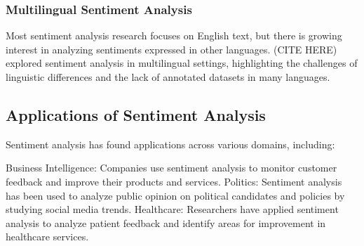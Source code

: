 \subsubsection{Multilingual Sentiment Analysis}

Most sentiment analysis research focuses on English text, but there is growing interest in analyzing sentiments expressed in other languages. (CITE HERE) explored sentiment analysis in multilingual settings, highlighting the challenges of linguistic differences and the lack of annotated datasets in many languages.

\subsection{Applications of Sentiment Analysis}

Sentiment analysis has found applications across various domains, including:

Business Intelligence: Companies use sentiment analysis to monitor customer feedback and improve their products and services.
Politics: Sentiment analysis has been used to analyze public opinion on political candidates and policies by studying social media trends.
Healthcare: Researchers have applied sentiment analysis to analyze patient feedback and identify areas for improvement in healthcare services.
